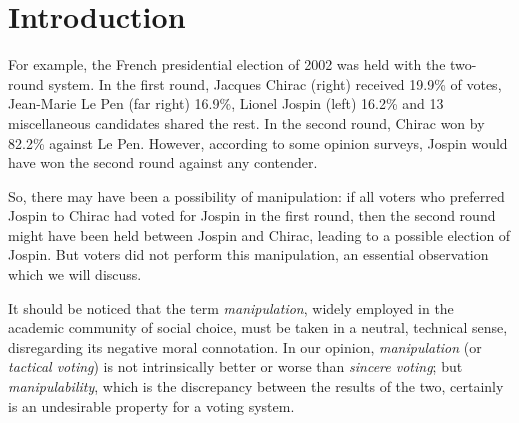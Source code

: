 \chapter{Introduction}\label{sec:introduction}

For example, the French presidential election of 2002 was held with the two-round system. In the first round, Jacques Chirac (right) received 19.9\% of votes, Jean-Marie Le Pen (far right) 16.9\%, Lionel Jospin (left) 16.2\% and 13 miscellaneous candidates shared the rest. In the second round, Chirac won by 82.2\% against Le Pen. However, according to some opinion surveys, Jospin would have won the second round against any contender.

So, there may have been a possibility of manipulation: if all voters who preferred Jospin to Chirac had voted for Jospin in the first round, then the second round might have been held between Jospin and Chirac, leading to a possible election of Jospin. But voters did not perform this manipulation, an essential observation which we will discuss.

\medskip


It should be noticed that the term \emph{manipulation}, widely employed in the academic community of social choice, must be taken in a neutral, technical sense, disregarding its negative moral connotation. In our opinion, \emph{manipulation} (or \emph{tactical voting}) is not intrinsically better or worse than \emph{sincere voting}; but \textit{manipulability}, which is the discrepancy between the results of the two, certainly is an undesirable property for a voting system.


